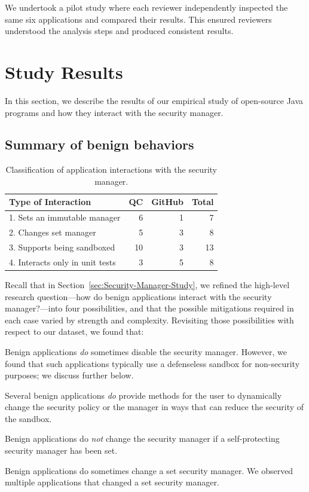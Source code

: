 \documentclass{sig-alternate}
\begin{document}
We undertook a pilot study where each reviewer
independently inspected the same six applications and compared their
results. This ensured reviewers understood the analysis steps and produced
consistent results.


\section{Study Results}\label{sec:Study-results}

In this section, we describe the results of our empirical study of open-source
Java programs and how they interact with the security manager. 

\subsection{Summary of benign behaviors}\label{sub:Evaluation-of-the-hypotheses}


\begin{table}
\caption{Classification of application
  interactions \label{tab:Classification-of-Application}
with the security manager.}
\begin{tabular}{lrrr}
\toprule 
Type of Interaction & QC & GitHub & Total\tabularnewline
\midrule
1. Sets an immutable manager & 6 & 1 & 7\tabularnewline
2. Changes set manager & 5 & 3 & 8\tabularnewline
3. Supports being sandboxed & 10 & 3 & 13\tabularnewline
4. Interacts only in unit tests & 3 & 5 & 8\tabularnewline
\bottomrule
\end{tabular}
\end{table}

Recall that in Section~\ref{sec:Security-Manager-Study}, we refined the
high-level research question---how do benign applications interact with the
security manager?---into four possibilities, and that the possible mitigations
required in each case varied by strength and complexity.  Revisiting those
possibilities with respect to our dataset, we found that:
\begin{flushenum}\setlength{\parskip}{0pt}
  \setlength{\parsep}{0pt}
  \setlength{\itemsep}{0pt}
\item Benign applications \emph{do} sometimes disable the security manager.
  However, we found that such applications typically use a defenseless sandbox for
  non-security purposes; we discuss further below.

\item Several benign applications \emph{do} provide methods for the user to
  dynamically change the security policy or the manager in ways that can reduce
  the security of the sandbox.

\item Benign applications do \emph{not} change the
security manager if a self-protecting security manager has been set.  

\item Benign applications do sometimes change a set security manager.  We
  observed multiple applications that changed a set security manager.
\end{flushenum}
\end{document}

